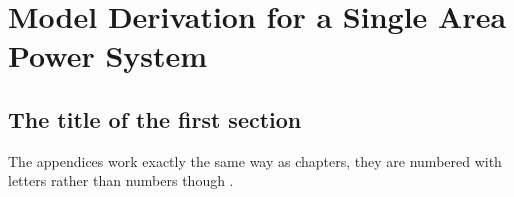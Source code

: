 \chapter{Model Derivation for a Single Area Power System}
\section{The title of the first section}
The appendices work exactly the same way as chapters, they are numbered with letters rather than numbers though \autocite{Ogat2010}.